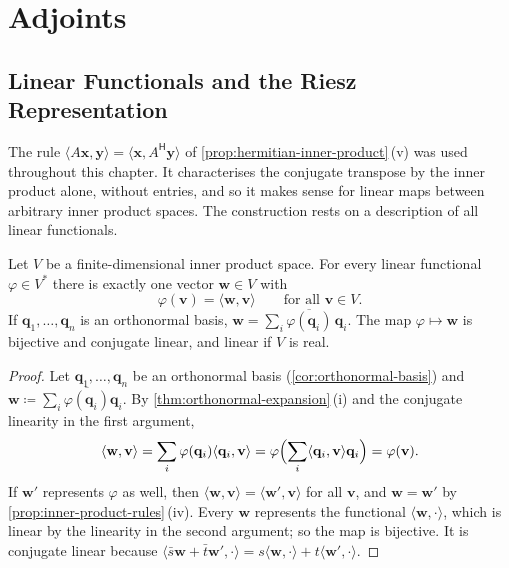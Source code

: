 \section{Adjoints}
\label{sec:adjoints}

\subsection{Linear Functionals and the Riesz Representation}

The rule $\langle A\mathbf x,\mathbf y\rangle=\langle\mathbf x,A^{\mathsf H}\mathbf y\rangle$ of \cref{prop:hermitian-inner-product}\,(v) was used throughout this chapter. It characterises the conjugate transpose by the inner product alone, without entries, and so it makes sense for linear maps between arbitrary inner product spaces. The construction rests on a description of all linear functionals.

\begin{theorem}
\label{thm:riesz}
Let $V$ be a finite-dimensional inner product space. For every linear functional $\varphi\in V^*$ there is exactly one vector $\mathbf w\in V$ with
\[
\varphi(\mathbf v)=\langle\mathbf w,\mathbf v\rangle\qquad\text{for all }\mathbf v\in V .
\]
If $\mathbf q_1,\ldots,\mathbf q_n$ is an orthonormal basis, $\mathbf w=\sum_i\overline{\varphi(\mathbf q_i)}\,\mathbf q_i$. The map $\varphi\mapsto\mathbf w$ is bijective and conjugate linear, and linear if $V$ is real.
\end{theorem}

\begin{proof}
Let $\mathbf q_1,\ldots,\mathbf q_n$ be an orthonormal basis (\cref{cor:orthonormal-basis}) and $\mathbf w\coloneqq\sum_i\overline{\varphi(\mathbf q_i)}\mathbf q_i$. By \cref{thm:orthonormal-expansion}\,(i) and the conjugate linearity in the first argument,
\[
\langle\mathbf w,\mathbf v\rangle=\sum_i\varphi(\mathbf q_i)\langle\mathbf q_i,\mathbf v\rangle=\varphi\Bigl(\sum_i\langle\mathbf q_i,\mathbf v\rangle\mathbf q_i\Bigr)=\varphi(\mathbf v).
\]
If $\mathbf w'$ represents $\varphi$ as well, then $\langle\mathbf w,\mathbf v\rangle=\langle\mathbf w',\mathbf v\rangle$ for all $\mathbf v$, and $\mathbf w=\mathbf w'$ by \cref{prop:inner-product-rules}\,(iv). Every $\mathbf w$ represents the functional $\langle\mathbf w,\cdot\rangle$, which is linear by the linearity in the second argument; so the map is bijective. It is conjugate linear because $\langle\bar s\mathbf w+\bar t\mathbf w',\cdot\rangle=s\langle\mathbf w,\cdot\rangle+t\langle\mathbf w',\cdot\rangle$.
\end{proof}

